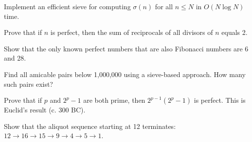 \begin{exercise}[Computational]
Implement an efficient sieve for computing $\sigma(n)$ for all $n \leq N$ in $O(N \log N)$ time.
\end{exercise}

\begin{exercise}
Prove that if $n$ is perfect, then the sum of reciprocals of all divisors of $n$ equals 2.
\end{exercise}

\begin{exercise}
Show that the only known perfect numbers that are also Fibonacci numbers are 6 and 28.
\end{exercise}

\begin{exercise}[Computational]
Find all amicable pairs below 1,000,000 using a sieve-based approach. How many such pairs exist?
\end{exercise}

\begin{exercise}
Prove that if $p$ and $2^p - 1$ are both prime, then $2^{p-1}(2^p - 1)$ is perfect. This is Euclid's result (c. 300 BC).
\end{exercise}

\begin{exercise}
Show that the aliquot sequence starting at 12 terminates: $12 \rightarrow 16 \rightarrow 15 \rightarrow 9 \rightarrow 4 \rightarrow 5 \rightarrow 1$.
\end{exercise}
